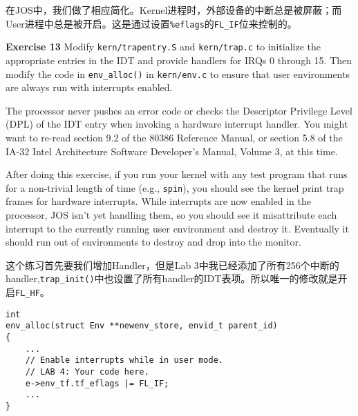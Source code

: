 \documentclass[11pt]{article}
\begin{document}
在JOS中，我们做了相应简化。Kernel进程时，外部设备的中断总是被屏蔽；而User进程中总是被开启。这是通过设置\lstinline|%eflags|的\lstinline|FL_IF|位来控制的。

\begin{framed}
\noindent\textbf{Exercise 13} Modify \lstinline|kern/trapentry.S| and \lstinline|kern/trap.c| to initialize the appropriate entries in the IDT and provide handlers for IRQs 0 through 15. Then modify the code in \lstinline|env_alloc()| in \lstinline|kern/env.c| to ensure that user environments are always run with interrupts enabled.

The processor never pushes an error code or checks the Descriptor Privilege Level (DPL) of the IDT entry when invoking a hardware interrupt handler. You might want to re-read section 9.2 of the 80386 Reference Manual, or section 5.8 of the IA-32 Intel Architecture Software Developer's Manual, Volume 3, at this time.

After doing this exercise, if you run your kernel with any test program that runs for a non-trivial length of time (e.g., \lstinline|spin|), you should see the kernel print trap frames for hardware interrupts. While interrupts are now enabled in the processor, JOS isn't yet handling them, so you should see it misattribute each interrupt to the currently running user environment and destroy it. Eventually it should run out of environments to destroy and drop into the monitor.
\end{framed}
这个练习首先要我们增加Handler，但是Lab 3中我已经添加了所有256个中断的handler,\lstinline|trap_init()|中也设置了所有handler的IDT表项。所以唯一的修改就是开启\lstinline|FL_HF|。
\begin{lstlisting}[title=kern/env.c]
int
env_alloc(struct Env **newenv_store, envid_t parent_id)
{
	...
	// Enable interrupts while in user mode.
	// LAB 4: Your code here.
	e->env_tf.tf_eflags |= FL_IF;
	...
}
\end{lstlisting}
\end{document}
